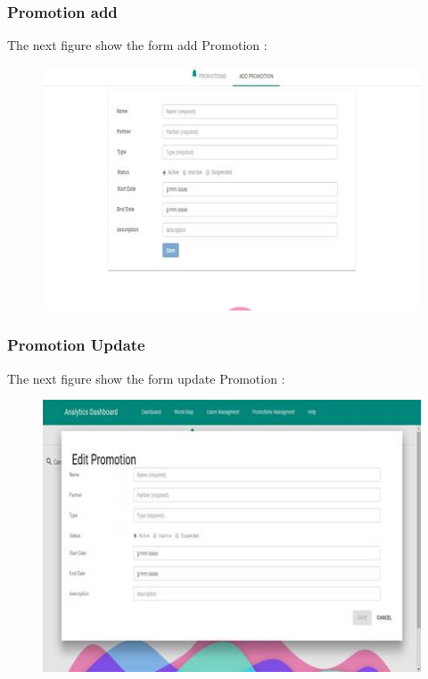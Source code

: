 \subsubsection{Promotion add}
\label{sec:sec01}
The next figure show the form add Promotion :
\begin{figure}[h!]
	\centering
	\includegraphics[height=0.3\textheight]{fig01/PromotionAdd}
	\label{fig:FilialesEtClients}
\end{figure}
\subsubsection{Promotion Update}
\label{sec:sec01}
The next figure show the form update Promotion :
\begin{figure}[h!]
	\centering
	\includegraphics[height=0.3\textheight]{fig01/PromotionUpdate}
	\label{fig:FilialesEtClients}
\end{figure}
